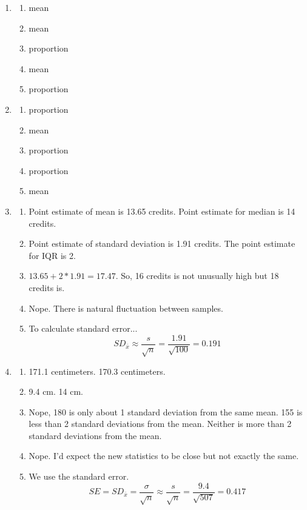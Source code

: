 \documentclass[12pt,letterpaper]{article}
\begin{document}
\newcommand{\N}[2]{\mathcal{N}\big(#1,~#2\big)}
\newcommand{\Geo}[1]{\texttt{Geo}\big(#1\big)}
\newcommand{\B}[2]{\mathcal{B}\big(#1,~#2\big)}
\newcommand{\AND}{\textsc{~and~}}
\newcommand{\OR}{\textsc{~or~}}


\begin{enumerate}
\item \begin{enumerate}
\item mean
\item mean
\item proportion
\item mean
\item proportion
\end{enumerate}

\item \begin{enumerate}
\item proportion
\item mean
\item proportion
\item proportion
\item mean
\end{enumerate}

\item \begin{enumerate}
\item Point estimate of mean is 13.65 credits. Point estimate for median is 14 credits.
\item Point estimate of standard deviation is 1.91 credits. The point estimate for IQR is 2.
\item $13.65+2*1.91 = 17.47$. So, 16 credits is not unusually high but 18 credits is.
\item Nope. There is natural fluctuation between samples.
\item To calculate standard error...
$$SD_{\bar{x}} \approx \frac{s}{\sqrt{n}} = \frac{1.91}{\sqrt{100}} = 0.191 $$
\end{enumerate}

\item \begin{enumerate}
\item 171.1 centimeters. 170.3 centimeters.
\item 9.4 cm. 14 cm.
\item Nope, 180 is only about 1 standard deviation from the same mean. 155 is less than 2 standard deviations from the mean. Neither is more than 2 standard deviations from the mean.
\item Nope. I'd expect the new statistics to be close but not exactly the same.
\item We use the standard error. $$SE=SD_{\bar{x}} = \frac{\sigma}{\sqrt{n}} \approx \frac{s}{\sqrt{n}} = \frac{9.4}{\sqrt{507}} = 0.417 $$
\end{enumerate}


\end{enumerate}
\end{document}
